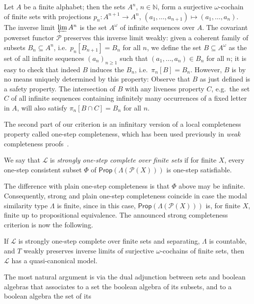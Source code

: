 \documentclass[proceedings]{stacs}
\theoremstyle{definition}
\theoremstyle{plain}
\newcommand{\Pow}{\mathcal{P}}
\newcommand{\Lang}{\mathcal{L}}
\newcommand{\Nat}{{\mathbb{N}}}
\newcommand{\Prop}{\mathsf{Prop}}
\newcommand{\invlim}{\varprojlim}
\begin{document}
\begin{exa}\label{exa:cochains}
  Let $A$ be a finite alphabet; then the sets $A^n$, $n\in\Nat$, form
  a surjective $\omega$-cochain of finite sets with projections
  $p_n:A^{n+1}\to A^n$, $(a_1,\dots,a_{n+1})\mapsto
  (a_1,\dots,a_n)$. The inverse limit $\invlim A^n$ is the set
  $A^\omega$ of infinite sequences over $A$. The covariant powerset
  functor $\Pow$ preserves this inverse limit weakly: given a coherent
  family of subsets $B_n\subseteq A^n$, i.e.\ $p_n[B_{n+1}]=B_n$ for
  all $n$, we define the set $B\subseteq A^\omega$ as the set of all
  infinite sequences $(a_n)_{n\ge 1}$ such that $(a_1,\dots,a_n)\in
  B_n$ for all $n$; it is easy to check that indeed $B$ induces the
  $B_n$, i.e.\ $\pi_n[B]=B_n$. However, $B$ is by no means uniquely
  determined by this property: Observe that $B$ as just defined is a
  safety property. The intersection of $B$ with any liveness property
  $C$, e.g.\ the set $C$ of all infinite sequences containing
  infinitely many occurrences of a fixed letter in $A$, will also
  satisfy $\pi_n[B\cap C]=B_n$ for all $n$.
\end{exa}
\noindent The second part of our criterion is an infinitary version of
a local completeness property called one-step completeness, which has
been used previously in \emph{weak} completeness
proofs~\cite{Pattinson03,Schroder07}.
\begin{defi}
  We say that $\Lang$ is \emph{strongly one-step complete over finite
    sets} if for finite $X$, every one-step consistent subset $\Phi$
  of $\Prop(\Lambda(\Pow(X)))$ is one-step satisfiable.
\end{defi}
\noindent 
The difference with plain one-step completeness is that $\Phi$ above
may be infinite. Consequently, strong and plain one-step completeness
coincide in case the modal similarity type $\Lambda$ is finite, since
in this case, $\Prop(\Lambda(\Pow(X)))$ is, for finite $X$, finite up
to propositional equivalence. The announced strong completeness
criterion is now the following.
\begin{thm}\label{thm:can-model}
  If $\Lang$ is strongly one-step complete over finite sets and
  separating, $\Lambda$ is countable, and $T$ weakly preserves inverse
  limits of surjective $\omega$-cochains of finite sets, then $\Lang$
  has a quasi-canonical model.
\end{thm}
  The most natural argument is via the dual adjunction between sets
  and boolean algebras that associates to a set the boolean algebra of
  its subsets, and to a boolean algebra the set of its
\end{document}
